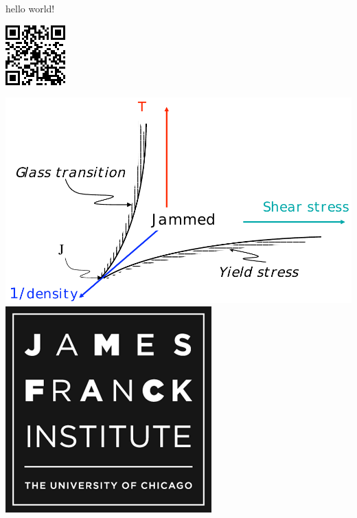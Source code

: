 \documentclass{article}
\begin{document}
hello world! 


\includegraphics[width=.1\linewidth]{figures/tracking}

\includegraphics[width=\linewidth]{figures/jpd}
\includegraphics[width=.1\linewidth]{figures/jfi_logo}
\end{document}
